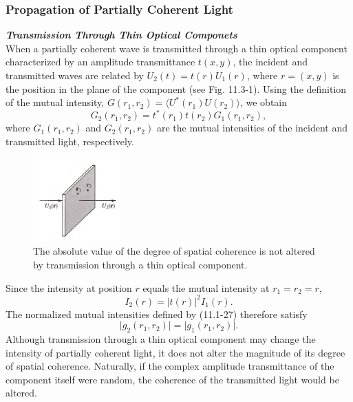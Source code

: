 \documentclass{article}
\numberwithin{figure}{subsection}
\numberwithin{table}{subsection}
\begin{document}
\bigbreak\begingroup
\color{ksc}
\subsubsection{Propagation of Partially Coherent Light}
\endgroup
\bigbreak\noindent\textcolor{ksc}{\textbf{\textsl{Transmission Through Thin Optical Componets}}}\\
When a partially coherent wave is transmitted through a thin optical component characterized by an amplitude transmittance $t(x,y)$,  the incident and transmitted waves are related by $U_2 (t) = t(r) U_1 (r)$, where $r = (x,y)$ is the position in the plane of the component (see Fig. 11.3-1). Using the definition of the mutual intensity, $G(r_1, r_2) = \langle U^\ast (r_1) U(r_2) \rangle$, we obtain
\begin{equation}
G_2 (r_1, r_2) = t^\ast (r_1) t(r_2) G_1(r_1, r_2) ,
\end{equation}
where $G_1(r_1, r_2)$ and $G_2(r_1, r_2)$ are the mutual intensities of the incident and transmitted light, respectively.
\begin{figure}[H]
\centering
\includegraphics[width=0.3\textwidth]{11_3_1.PNG}
\caption{The absolute value of the degree of spatial coherence is not altered by transmission through a thin optical component.}
\label{fig: 11_3_1}
\end{figure}
\par Since the intensity at position $r$ equals the mutual intensity at $r_1 =  r_2 = r $,
\begin{equation}
I_2 (r) = \lvert t(r) \rvert ^2 I_1 (r) .
\end{equation}
The normalized mutual intensities defined by (11.1-27) therefore satisfy
\begin{equation}
\lvert g_2 (r_1, r_2) \rvert = \lvert g_1 (r_1, r_2) \rvert .
\end{equation}
Although transmission through a thin optical component may change the intensity of partially coherent light, it does not alter the magnitude of its degree of spatial coherence. Naturally, if the complex amplitude transmittance of the component itself were random, the coherence of the transmitted light would be altered.
\end{document}
